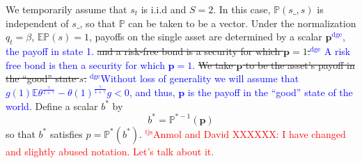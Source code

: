 \documentclass[12pt]{article}
\newcommand{\dge}[1]{\textcolor{blue}{$^{\textrm{dge}}${#1}}}
\newcommand{\tjs}[1]{\textcolor{red}{$^{\textrm{tjs}}${#1}}}
\newcommand{\EE}{\mathbb E}
\begin{document}
We temporarily assume that $s_t$ is i.i.d and  $S=2$.
In this case, $\mathbb{P}(s\_,s)$ is independent of $s\_$, so that $\mathbb{P}$ can be taken to be  a vector.
 Under the normalization  $q_t = \beta$,  $\mathbb{E}\mathbb{P}(s)=1$, payoffs on the single asset are  determined by a  scalar $\bm{p}$\dge{, the payoff in state 1.}
 \st{and a risk-free bond is a security for which $\bm{p}=1$.}\dge{  A risk free bond is then a security for which $\bm{p} = 1$.}  
\st{We take $\bm{p}$ to be the asset's payoff in the ``good'' state $s$.}  \dge{Without loss of generality we will assume that $ g(1)\EE\theta^\frac{\gamma}{1+\gamma}-\theta(1)^\frac\gamma{1+\gamma} g <0$, and thus, $\bm p$ is the payoff in the ``good'' state of the world.}
Define a scalar $b^*$ by %
\begin{equation}
\label{eq-ss}
 b^* =  {\mathbb P}^{* -1}(\bm{p})
\end{equation}
so that $b^*$ satisfies $p={\mathbb P}^*(b^*)$.
\tjs{Anmol and David XXXXXX: I have changed and slightly abused notation. Let's talk about it.}
\end{document}
